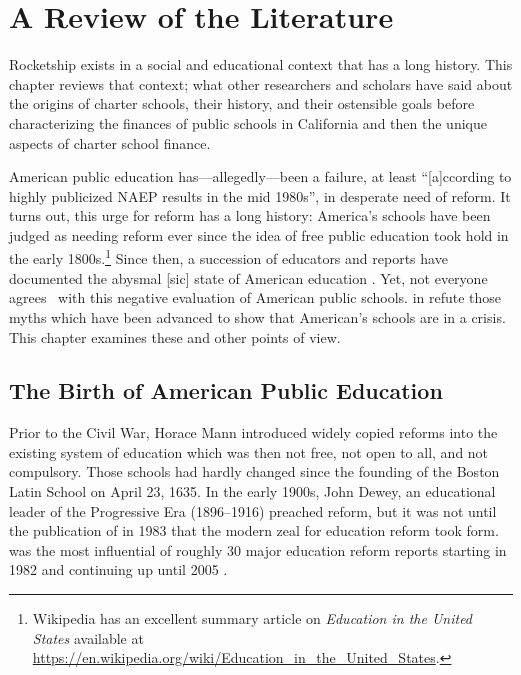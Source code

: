 \chapter{A Review of the Literature}\label{ch:litreview}
Rocketship exists in a social and educational context that has a long history. This chapter reviews that context; what other researchers and scholars have said about the origins of charter schools, their history, and their ostensible goals before characterizing the finances of public schools in California and then the unique aspects of charter school finance. 

 American public education has—allegedly—been a failure, at least ``[a]ccording to highly publicized NAEP results in the mid 1980s'', in desperate need of reform. It turns out, this urge for reform has a long history: America's schools have been judged as needing reform ever since the idea of free public education took hold in the early 1800s.\footnote{Wikipedia has an excellent summary article on \textit{Education in the United States} available at \url{https://en.wikipedia.org/wiki/Education_in_the_United_States}.} Since then, a succession of educators and reports have documented the abysmal [sic] state of American education \parencite{Gove.Meier2000}. Yet, not everyone agrees  with this negative evaluation of American public schools. \textcite{Berliner.Glass2014} in  refute those myths which have been advanced to show that American's schools are in a crisis. This chapter examines these and other points of view.

\section{The Birth of American Public Education}\label{sec:birth-amer-publ}\indent%

Prior to the Civil War, Horace Mann introduced widely copied reforms \parencite%
{Pulliam.VanPatten2007} into the existing system of education which was then not free, not open to all, and not compulsory. Those schools had hardly changed since the founding of the Boston Latin School on April 23, 1635. In the early 1900s, John Dewey, an educational leader of the Progressive Era (1896–1916) preached reform, but it was not until the publication of  in 1983 that the modern zeal for education reform took form.  was the most influential of roughly 30  major education reform reports starting in 1982 and continuing up until 2005 \textcite[252]{Pulliam.VanPatten2007}.

